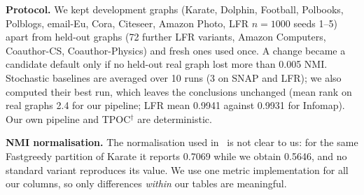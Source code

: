 \documentclass[conference]{IEEEtran}
\begin{document}
\textbf{Protocol.} We kept development graphs (Karate, Dolphin, Football, Polbooks, Polblogs, email-Eu, Cora, Citeseer, Amazon Photo, LFR $n{=}1000$ seeds 1--5) apart from held-out graphs (72 further LFR variants, Amazon Computers, Coauthor-CS, Coauthor-Physics) and fresh ones used once. A change became a candidate default only if no held-out real graph lost more than 0.005 NMI. Stochastic baselines are averaged over 10 runs (3 on SNAP and LFR); we also computed their best run, which leaves the conclusions unchanged (mean rank on real graphs 2.4 for our pipeline; LFR mean 0.9941 against 0.9931 for Infomap). Our own pipeline and TPOC$^{\dagger}$ are deterministic.

\textbf{NMI normalisation.} The normalisation used in~\cite{kong2026} is not clear to us: for the same Fastgreedy partition of Karate it reports 0.7069 while we obtain 0.5646, and no standard variant reproduces its value. We use one metric implementation for all our columns, so only differences \emph{within} our tables are meaningful.
\end{document}
